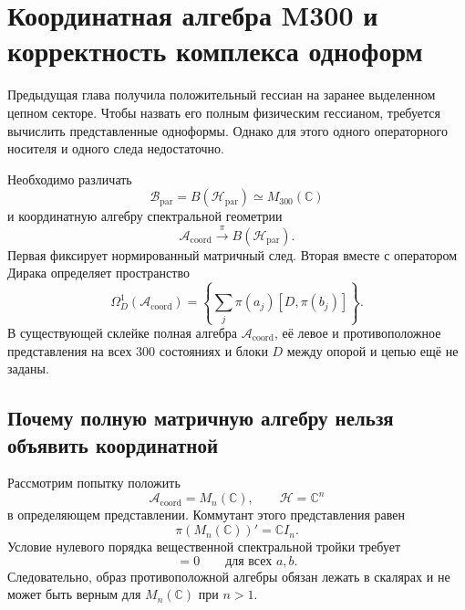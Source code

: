 \chapter{Координатная алгебра M300 и корректность комплекса одноформ}

Предыдущая глава получила положительный гессиан на заранее выделенном
цепном секторе. Чтобы назвать его полным физическим гессианом, требуется
вычислить представленные одноформы. Однако для этого одного операторного
носителя и одного следа недостаточно.

Необходимо различать
\begin{equation}
 \mathcal B_{\mathrm{par}}=B(\mathcal H_{\mathrm{par}})
 \simeq M_{300}(\mathbb C)
\end{equation}
и координатную алгебру спектральной геометрии
\begin{equation}
 \mathcal A_{\mathrm{coord}}
 \xrightarrow{\ \pi\ }
 B(\mathcal H_{\mathrm{par}}).
\end{equation}
Первая фиксирует нормированный матричный след. Вторая вместе с оператором
Дирака определяет пространство
\begin{equation}
 \Omega_D^1(\mathcal A_{\mathrm{coord}})
 =\left\{
 \sum_j\pi(a_j)[D,\pi(b_j)]
 \right\}.
 \label{eq:v5-m300-oneforms-definition}
\end{equation}
В существующей склейке полная алгебра $\mathcal A_{\mathrm{coord}}$, её
левое и противоположное представления на всех 300 состояниях и блоки $D$
между опорой и цепью ещё не заданы.

\section{Почему полную матричную алгебру нельзя объявить координатной}

Рассмотрим попытку положить
\begin{equation}
 \mathcal A_{\mathrm{coord}}=M_n(\mathbb C),
 \qquad \mathcal H=\mathbb C^n
\end{equation}
в определяющем представлении. Коммутант этого представления равен
\begin{equation}
 \pi(M_n(\mathbb C))'=\mathbb C I_n.
\end{equation}
Условие нулевого порядка вещественной спектральной тройки требует
\begin{equation}
 [\pi(a),J\pi(b)J^{-1}]=0
 \qquad \text{для всех }a,b.
\end{equation}
Следовательно, образ противоположной алгебры обязан лежать в скалярах и
не может быть верным для $M_n(\mathbb C)$ при $n>1$.

